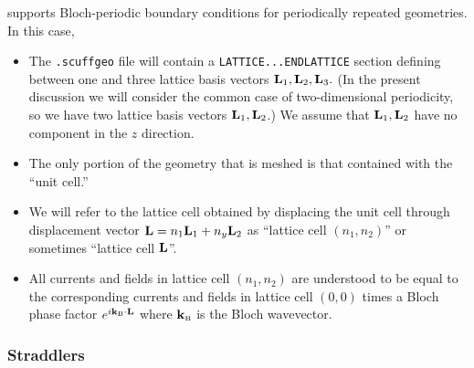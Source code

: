 \documentclass[letterpaper]{article}
\newcommand{\KB}{\vb k\subt{B}}
\begin{document}
\lss supports Bloch-periodic boundary conditions for
periodically repeated geometries. In this case,

\begin{itemize}
 \item The \texttt{.scuffgeo} file will contain
       a \texttt{LATTICE...ENDLATTICE} section defining 
       between one and three lattice basis vectors 
       $\mathbf{L}_1, \mathbf{L}_2, \mathbf{L}_3.$ (In the present 
       discussion we will consider the common case
       of two-dimensional periodicity, so we have two
       lattice basis vectors $\mathbf{L}_1, \mathbf{L}_2$.) 
       We assume that $\mathbf{L}_1, \mathbf{L}_2$ have no 
       component in the $z$ direction.
 \item The only portion of the geometry that is
       meshed is that contained with the ``unit cell.''
 \item We will refer to the lattice cell obtained by 
       displacing the unit cell through displacement 
       vector $\mathbf{L}=n_1 \mathbf{L}_1 + n_y \mathbf{L}_2$ as 
       ``lattice cell $(n_1, n_2)$'' or sometimes
       ``lattice cell $\mathbf{L}$''.
 \item All currents and fields in lattice cell $(n_1,n_2)$
       are understood to be equal to the corresponding
       currents and fields in lattice cell $(0,0)$ times
       a Bloch phase factor $e^{i\KB \cdot \vb L}$ where
       $\KB$ is the Bloch wavevector.
\end{itemize}

\subsubsection{Straddlers}
\end{document}

